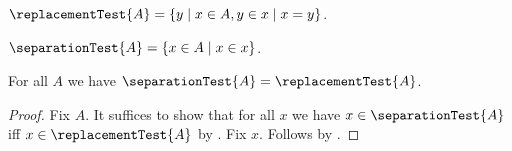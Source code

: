 \begin{definition}\label{replacement_test_definition}
    $\replacementTest{A} = \{ y \mid x \in A, y \in x \mid x = y \}$.
\end{definition}

\begin{definition}\label{separation_test_definition}
    $\separationTest{A} = \{x\in A \mid x\in x\}$.
\end{definition}

\begin{proposition}\label{replacement_separation_theorem}
    For all $A$ we have $\separationTest{A} = \replacementTest{A}$.
\end{proposition}
\begin{proof}
    Fix $A$.
    It suffices to show that for all $x$ we have $x\in \separationTest{A}$ iff $x\in \replacementTest{A}$ by .
    Fix $x$.
    Follows by .
\end{proof}
